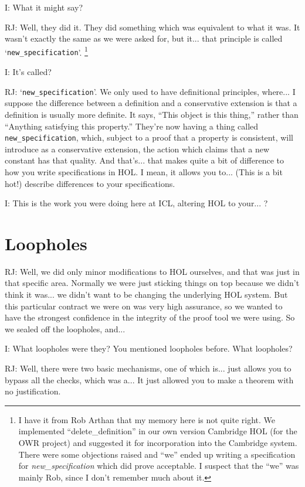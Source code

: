 \documentclass[10pt,titlepage]{book}
\begin{document}
I: What it might say?

RJ: Well, they did it.
They did something which was equivalent to what it was.
It wasn't exactly the same as we were asked for, but it... that principle is called `{\tt new\_specification}'.
\footnote{I have it from Rob Arthan that my memory here is not quite right.
We implemented ``delete\_definition'' in our own version Cambridge HOL (for the OWR project) and suggested it for incorporation into the Cambridge system.
There were some objections raised and ``we'' ended up writing a specification for \emph{new\_specification} which did prove acceptable.
I suspect that the ``we'' was mainly Rob, since I don't remember much about it.}

I: It's called?

RJ: `{\tt new\_specification}'.
We only used to have definitional principles, where... I suppose the difference between a definition and a conservative extension is that a definition is usually more definite.
It says, ``This object is this thing,'' rather than ``Anything satisfying this property.''
They're now having a thing called {\tt new\_specification}, which, subject to a proof that a property is consistent, will introduce as a conservative extension, the action which claims that a new constant has that quality.
And that's... that makes quite a bit of difference to how you write specifications in HOL. I mean, it allows you to... (This is a bit hot!) describe differences to your specifications.

I: This is the work you were doing here at ICL, altering HOL to your... ?

\section{Loopholes}

RJ: Well, we did only minor modifications to HOL ourselves, and that was just in that specific area.
Normally we were just sticking things on top because we didn't think it was... we didn't want to be changing the underlying HOL system.
But this particular contract we were on was very high assurance, so we wanted to have the strongest confidence in the integrity of the proof tool we were using.
So we sealed off the loopholes, and... 

I: What loopholes were they? You mentioned loopholes before. What loopholes?

RJ: Well, there were two basic mechanisms, one of which is... just allows you to bypass all the checks, which was a... 
It just allowed you to make a theorem with no justification.
\end{document}
